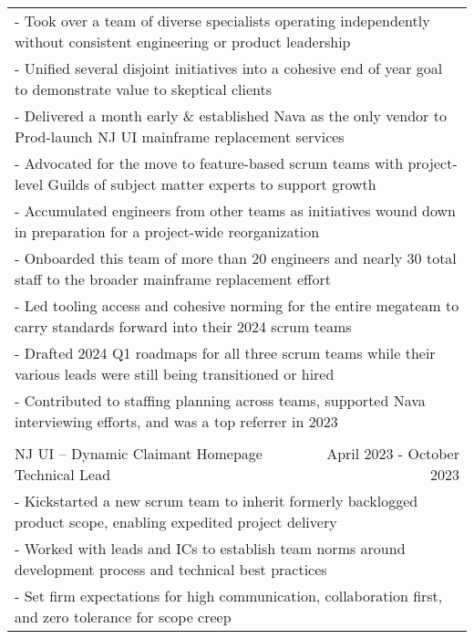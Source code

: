 \documentclass[letterpaper]{article}
\begin{document}
\begin{center}
\begin{tabular}{p{}p{}r}
			  \multicolumn{3}{p{\textwidth}}{\quad\quad - Took over a team of diverse specialists operating independently without consistent engineering or product leadership} \\
			  \multicolumn{3}{p{\textwidth}}{\quad\quad - Unified several disjoint initiatives into a cohesive end of year goal to demonstrate value to skeptical clients} \\
			  \multicolumn{3}{p{\textwidth}}{\quad\quad - Delivered a month early \& established Nava as the only vendor to Prod-launch NJ UI mainframe replacement services} \\
			  \multicolumn{3}{p{\textwidth}}{\quad\quad - Advocated for the move to feature-based scrum teams with project-level Guilds of subject matter experts to support growth} \\
			  \multicolumn{3}{p{\textwidth}}{\quad\quad - Accumulated engineers from other teams as initiatives wound down in preparation for a project-wide reorganization} \\
			  \multicolumn{3}{p{\textwidth}}{\quad\quad - Onboarded this team of more than 20 engineers and nearly 30 total staff to the broader mainframe replacement effort} \\
			  \multicolumn{3}{p{\textwidth}}{\quad\quad - Led tooling access and cohesive norming for the entire megateam to carry standards forward into their 2024 scrum teams} \\
			  \multicolumn{3}{p{\textwidth}}{\quad\quad - Drafted 2024 Q1 roadmaps for all three scrum teams while their various leads were still being transitioned or hired} \\
			  \multicolumn{3}{p{\textwidth}}{\quad\quad - Contributed to staffing planning across teams, supported Nava interviewing efforts, and was a top referrer in 2023} 
		  \\
		  \\		%
			  \multicolumn{2}{p{0.5\textwidth}}{\quad NJ UI -- Dynamic Claimant Homepage Technical Lead}
			  &
			  {April 2023 - October 2023 \quad\quad\quad\quad}
		  \\
			  \multicolumn{3}{p{\textwidth}}{\quad\quad - Kickstarted a new scrum team to inherit formerly backlogged product scope, enabling expedited project delivery} \\
			  \multicolumn{3}{p{\textwidth}}{\quad\quad - Worked with leads and ICs to establish team norms around development process and technical best practices} \\
			  \multicolumn{3}{p{\textwidth}}{\quad\quad - Set firm expectations for high communication, collaboration first, and zero tolerance for scope creep} \\

\end{tabular}
\end{center}
\end{document}
